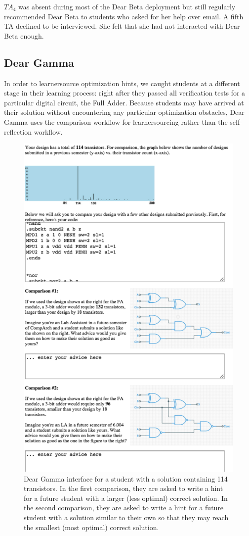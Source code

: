 $TA_{4}$ was absent during most of the Dear Beta deployment but still regularly recommended Dear Beta to students who asked for her help over email. A fifth TA declined to be interviewed. She felt that she had not interacted with Dear Beta enough.

\subsection{Dear Gamma}

In order to learnersource optimization hints, we caught students at a different stage in their learning process: right after they passed all verification tests for a particular digital circuit, the Full Adder. Because students may have arrived at their solution without encountering any particular optimization obstacles, Dear Gamma uses the comparison workflow for learnersourcing rather than the self-reflection workflow. 

\begin{figure}
\centering
\includegraphics[width=0.70\columnwidth]{Body/figures/classoverflow/deargamma_shortened.png}
\caption{Dear Gamma interface for a student with a solution containing 114 transistors. In the first comparison, they are asked to write a hint for a future student with a larger (less optimal) correct solution. In the second comparison, they are asked to write a hint for a future student with a solution similar to their own so that they may reach the smallest (most optimal) correct solution.}
\label{fig:deargamma}
\end{figure}

